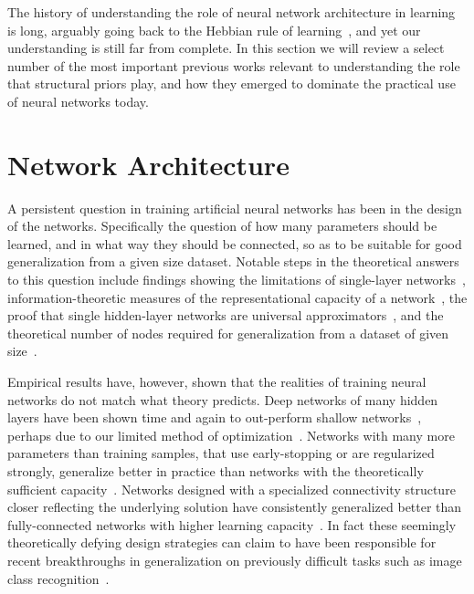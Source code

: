 \documentclass[thesis]{subfiles}
\begin{document}
	
	The history of understanding the role of neural network architecture in learning is long, arguably going back to the Hebbian rule of learning~\citep{hebb1949organization}, and yet our understanding is still far from complete. In this section we will review a select number of the most important previous works relevant to understanding the role that structural priors play, and how they emerged to dominate the practical use of neural networks today.
	
	\section{Network Architecture}
    A persistent question in training artificial neural networks has been in the design of the networks. Specifically the question of how many parameters should be learned, and in what way they should be connected,  so as to be suitable for good generalization from a given size dataset. Notable steps in the theoretical answers to this question include findings showing the limitations of single-layer networks~\citep{minsky1988perceptrons}, information-theoretic measures of the representational capacity of a network~\citep{vapnik2015uniform}, the proof that single hidden-layer networks are universal approximators~\citep{hornik89a}, and the theoretical number of nodes required for generalization from a dataset of given size~\citep{baum1989size}. 
    
    Empirical results have, however, shown that the realities of training neural networks do not match what theory predicts. Deep networks of many hidden layers have been shown time and again to out-perform shallow networks~\citep{Krizhevsky2012,Simonyan2014verydeep,He2015,He2016}, perhaps due to our limited method of optimization~\citep{NIPS2014_5484}. Networks with many more parameters than training samples, that use early-stopping or are regularized strongly, generalize better in practice than networks with the theoretically sufficient capacity~\citep{caruana2001overfitting, Krizhevsky2012, HintonTalk2015}. Networks designed with a specialized connectivity structure closer reflecting the underlying solution have consistently generalized better than fully-connected networks with higher learning capacity~\citep{lecun1989backpropagation,He2016}. In fact these seemingly theoretically defying design strategies can claim to have been responsible for recent breakthroughs in generalization on previously difficult tasks such as image class recognition~\citep{Krizhevsky2012, HintonTalk2015}.
    
\end{document}
